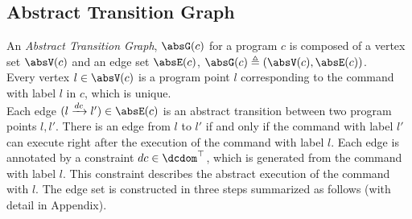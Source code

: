 \subsection{Abstract Transition Graph}
\label{sec:abs_prog}

An \emph{Abstract Transition Graph}, $\absG(c)$ for a program $c$ is composed of
a vertex set $\absV(c)$ and an edge set $\absE(c)$, $\absG(c) \triangleq (\absV(c), \absE(c))$.
\\
Every 
vertex $l \in \absV(c)$ is a program point $l$ corresponding to the command with label $l$ in $c$, which is unique.
\\
Each edge $(l \xrightarrow{dc} l') \in \absE(c)$ is an abstract transition
between two program points $l, l'$. 
There is an edge from $l$ to $l'$ if and only if
the command with label $l'$ can execute right after the execution of the command with label $l$.
Each edge is annotated by a constraint $dc \in \dcdom^{\top}$, which is generated from the command with label $l$.
This constraint describes the abstract execution of the command with $l$. 
The edge set is constructed in three steps summarized as follows (with detail in Appendix).
